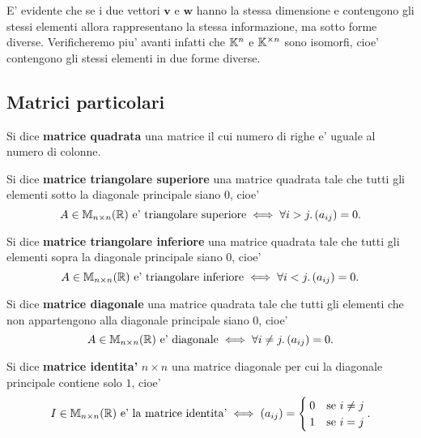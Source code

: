 E' evidente che se i due vettori $\bm{v}$ e $\bm{w}$ hanno la stessa dimensione e contengono gli stessi elementi allora rappresentano la stessa informazione, ma sotto forme diverse. Verificheremo piu' avanti infatti che $\mathbb{K}^n$ e $\mathbb{K}^{\times n}$ sono isomorfi, cioe' contengono gli stessi elementi in due forme diverse.

\subsection{Matrici particolari}

\begin{definition}
    Si dice \textbf{matrice quadrata} una matrice il cui numero di righe e' uguale al numero di colonne.
\end{definition}

\begin{definition}
    Si dice \textbf{matrice triangolare superiore} una matrice quadrata tale che tutti gli elementi sotto la diagonale principale siano $0$, cioe'
    \begin{equation}
        A \in \mathbb{M}_{n \times n}(\mathbb{R}) \text{ e' triangolare superiore}  \iff \forall i > j. \, (a_{ij}) = 0.
    \end{equation}
\end{definition}

\begin{definition}
    Si dice \textbf{matrice triangolare inferiore} una matrice quadrata tale che tutti gli elementi sopra la diagonale principale siano $0$, cioe'
    \begin{equation}
        A \in \mathbb{M}_{n \times n}(\mathbb{R}) \text{ e' triangolare inferiore} \iff \forall i < j. \, (a_{ij}) = 0.
    \end{equation}
\end{definition}

\begin{definition}
    Si dice \textbf{matrice diagonale} una matrice quadrata tale che tutti gli elementi che non appartengono alla diagonale principale siano $0$, cioe'
    \begin{equation}
        A \in \mathbb{M}_{n \times n}(\mathbb{R}) \text{ e' diagonale} \iff \forall i \neq j. \, (a_{ij}) = 0.
    \end{equation}
\end{definition}

\begin{definition}
    Si dice \textbf{matrice identita'} $n \times n$ una matrice diagonale per cui la diagonale principale contiene solo $1$, cioe'
    \begin{equation}
        I \in \mathbb{M}_{n \times n}(\mathbb{R}) \text{ e' la matrice identita'} \iff (a_{ij}) = \begin{cases}
            0   &\text{se } i \neq j \\
            1   &\text{se } i = j \\
        \end{cases}.
    \end{equation}
\end{definition}

